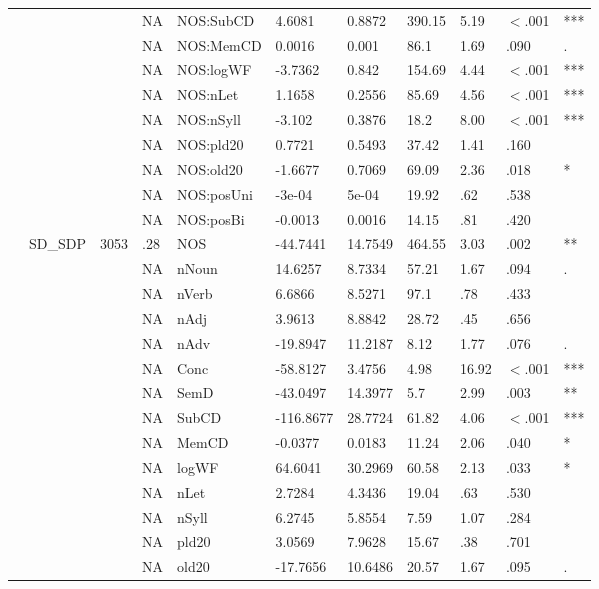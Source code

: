 \begin{table}[ht]
\begin{tabular}{lllllllllll}
   &  &  & NA & NOS:SubCD & 4.6081 & 0.8872 & 390.15 & 5.19 & $<$.001 & *** \\ 
   &  &  & NA & NOS:MemCD & 0.0016 & 0.001 & 86.1 & 1.69 & .090 & . \\ 
   &  &  & NA & NOS:logWF & -3.7362 & 0.842 & 154.69 & 4.44 & $<$.001 & *** \\ 
   &  &  & NA & NOS:nLet & 1.1658 & 0.2556 & 85.69 & 4.56 & $<$.001 & *** \\ 
   &  &  & NA & NOS:nSyll & -3.102 & 0.3876 & 18.2 & 8.00 & $<$.001 & *** \\ 
   &  &  & NA & NOS:pld20 & 0.7721 & 0.5493 & 37.42 & 1.41 & .160 &   \\ 
   &  &  & NA & NOS:old20 & -1.6677 & 0.7069 & 69.09 & 2.36 & .018 & * \\ 
   &  &  & NA & NOS:posUni & -3e-04 & 5e-04 & 19.92 & .62 & .538 &   \\ 
   &  &  & NA & NOS:posBi & -0.0013 & 0.0016 & 14.15 & .81 & .420 &   \\ 
   & SD\_SDP & 3053 & .28 & NOS & -44.7441 & 14.7549 & 464.55 & 3.03 & .002 & ** \\ 
   &  &  & NA & nNoun & 14.6257 & 8.7334 & 57.21 & 1.67 & .094 & . \\ 
   &  &  & NA & nVerb & 6.6866 & 8.5271 & 97.1 & .78 & .433 &   \\ 
   &  &  & NA & nAdj & 3.9613 & 8.8842 & 28.72 & .45 & .656 &   \\ 
   &  &  & NA & nAdv & -19.8947 & 11.2187 & 8.12 & 1.77 & .076 & . \\ 
   &  &  & NA & Conc & -58.8127 & 3.4756 & 4.98 & 16.92 & $<$.001 & *** \\ 
   &  &  & NA & SemD & -43.0497 & 14.3977 & 5.7 & 2.99 & .003 & ** \\ 
   &  &  & NA & SubCD & -116.8677 & 28.7724 & 61.82 & 4.06 & $<$.001 & *** \\ 
   &  &  & NA & MemCD & -0.0377 & 0.0183 & 11.24 & 2.06 & .040 & * \\ 
   &  &  & NA & logWF & 64.6041 & 30.2969 & 60.58 & 2.13 & .033 & * \\ 
   &  &  & NA & nLet & 2.7284 & 4.3436 & 19.04 & .63 & .530 &   \\ 
   &  &  & NA & nSyll & 6.2745 & 5.8554 & 7.59 & 1.07 & .284 &   \\ 
   &  &  & NA & pld20 & 3.0569 & 7.9628 & 15.67 & .38 & .701 &   \\ 
   &  &  & NA & old20 & -17.7656 & 10.6486 & 20.57 & 1.67 & .095 & . \\ 

\end{tabular}
\end{table}
